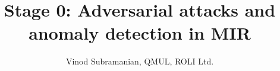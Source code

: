 \documentclass[journal,onecolumn]{IEEEtran}
\begin{document}
%
\title{Stage 0: Adversarial attacks and anomaly detection in MIR}
%
%
%

\author{Vinod Subramanian, QMUL, ROLI Ltd.}%


% 
%




% 
\end{document}
